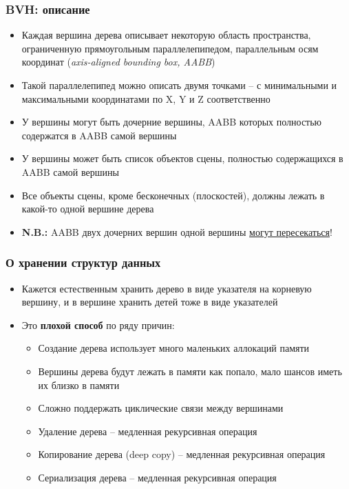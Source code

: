 \documentclass[10pt]{beamer}
\begin{document}
\begin{frame}[fragile]
\frametitle{BVH: описание}
\begin{itemize}
\item Каждая вершина дерева описывает некоторую область пространства, ограниченную прямоугольным параллелепипедом, параллельным осям координат (\textit{axis-aligned bounding box, AABB})
\pause
\item Такой параллелепипед можно описать двумя точками -- с минимальными и максимальными координатами по X, Y и Z соответственно
\pause
\item У вершины могут быть дочерние вершины, AABB которых полностью содержатся в AABB самой вершины
\pause
\item У вершины может быть список объектов сцены, полностью содержащихся в AABB самой вершины
\pause
\item Все объекты сцены, кроме бесконечных (плоскостей), должны лежать в какой-то одной вершине дерева
\pause
\item \textbf{\alert{N.B.:}} AABB двух дочерних вершин одной вершины \underline{могут пересекаться}!
\end{itemize}
\end{frame}

\begin{frame}[fragile]
\frametitle{О хранении структур данных}
\begin{itemize}
\item Кажется естественным хранить дерево в виде указателя на корневую вершину, и в вершине хранить детей тоже в виде указателей
\pause
\item Это \textbf{плохой способ} по ряду причин:
\pause
\begin{itemize}
\item Создание дерева использует много маленьких аллокаций памяти
\pause
\item Вершины дерева будут лежать в памяти как попало, мало шансов иметь их близко в памяти
\pause
\item Сложно поддержать циклические связи между вершинами
\pause
\item Удаление дерева -- медленная рекурсивная операция
\pause
\item Копирование дерева (deep copy) -- медленная рекурсивная операция
\pause
\item Сериализация дерева -- медленная рекурсивная операция
\end{itemize}
\end{itemize}
\end{frame}
\end{document}
